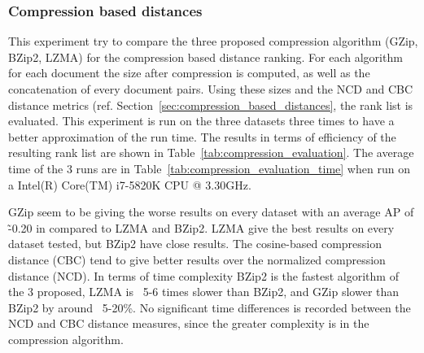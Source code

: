 \subsubsection{Compression based distances}

This experiment try to compare the three proposed compression algorithm (GZip, BZip2, LZMA) for the compression based distance ranking.
For each algorithm for each document the size after compression is computed, as well as the concatenation of every document pairs.
Using these sizes and the NCD and CBC distance metrics (ref. Section~\ref{sec:compression_based_distances}, the rank list is evaluated.
This experiment is run on the three datasets three times to have a better approximation of the run time.
The results in terms of efficiency of the resulting rank list are shown in Table~\ref{tab:compression_evaluation}.
The average time of the 3 runs are in Table~\ref{tab:compression_evaluation_time} when run on a Intel(R) Core(TM) i7-5820K CPU @ 3.30GHz.

GZip seem to be giving the worse results on every dataset with an average AP of \~-0.20 in compared to LZMA and BZip2.
LZMA give the best results on every dataset tested, but BZip2 have close results.
The cosine-based compression distance (CBC) tend to give better results over the normalized compression distance (NCD).
In terms of time complexity BZip2 is the fastest algorithm of the 3 proposed, LZMA is ~5-6 times slower than BZip2, and GZip slower than BZip2 by around ~5-20\%.
No significant time differences is recorded between the NCD and CBC distance measures, since the greater complexity is in the compression algorithm.

